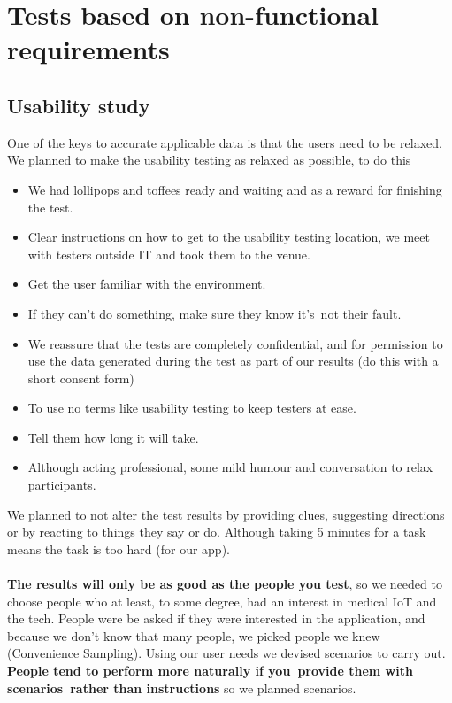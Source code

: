 \documentclass[12pt]{article}
\begin{document}
{	\section{Tests based on non-functional requirements}
	\subsection{Usability study}
	One of the keys to accurate applicable data is that the users need to be relaxed. We planned to make the usability testing as relaxed as possible, to do this
		\begin{itemize}
		\item We had lollipops and toffees ready and waiting and as a reward for finishing the test. 
		\item Clear instructions on how to get to the usability testing location, we meet with testers outside IT and took them to the venue. 
		\item Get the user familiar with the environment.
		\item If they can't do something, make sure they know it's not their fault. 
		\item We reassure that the tests are completely confidential, and for permission to use the data generated during the test as part of our results (do this with a short consent form) 
		\item To use no terms like usability testing to keep testers at ease.
		\item Tell them how long it will take.
		\item Although acting professional, some mild humour and conversation to relax participants.
		\end{itemize} 
		We planned to not alter the test results by providing clues, suggesting directions or by reacting to things they say or do. Although taking 5 minutes for a task means the task is too hard (for our app). \\ \\
		\textbf{The results will only be as good as the people you test}, so we needed to choose people who at least, to some degree, had an interest in medical IoT and the tech. People were be asked if they were interested in the application, and because we don’t know that many people, we picked people we knew (Convenience Sampling). Using our user needs we devised scenarios to carry out. \textbf{People tend to perform more naturally if you provide them with scenarios rather than instructions} so we planned scenarios.
}
\end{document}
